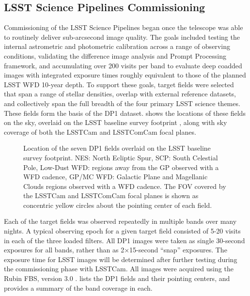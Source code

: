 \subsection{LSST Science Pipelines Commissioning
\label{ssec:pipelines_commissioning}}
Commissioning of the \gls{LSST Science Pipelines} \citep{PSTN-019} began once the telescope was able to routinely deliver sub-arcsecond image quality.
The goals included testing the internal astrometric and photometric calibration across a range of observing conditions, validating the difference image analysis and Prompt Processing \citep{dmtn-219} framework, and accumulating over 200 visits per band to evaluate deep coadded images with integrated exposure times roughly equivalent to those of the planned LSST \gls{WFD} 10-year depth.
To support these goals, \nfields target fields were selected that span a range of stellar densities, overlap with external reference datasets, and collectively span the full breadth of the four primary \gls{LSST} science themes.
These \nfields fields form the basis of the \gls{DP1} dataset.
 shows the locations of these \nfields fields on the sky, overlaid on the LSST baseline survey footprint \citep{PSTN-051, PSTN-052, PSTN-053, PSTN-055, PSTN-056}, along with sky coverage of both the LSSTCam and \gls{LSSTComCam} focal planes.
\begin{figure*}[bt!]
\centering
{}
\caption{Location of the seven DP1 fields overlaid on the \gls{LSST} baseline survey footprint. NES: North Ecliptic Spur, SCP: South Celestial Pole, Low-Dust WFD: regions away from the GP observed with a WFD cadence, GP/MC WFD: Galactic Plane and Magellanic Clouds regions observed with a WFD cadence. The \gls{FOV} covered by the \gls{LSSTCam} and \gls{LSSTComCam} focal planes is shown as concentric yellow circles about the pointing center of each field.}
\label{fig:dp1_fields_on_sky}
\end{figure*}
Each of the \nfields target fields was observed repeatedly in multiple bands over many nights.
A typical observing \gls{epoch} for a given target field consisted of 5-20 visits in each of the three loaded filters.
All DP1 images were taken as single 30-second exposures for all bands, rather than as 2×15-second “snap” exposures.
The exposure time for LSST images will be determined after further testing during the commissioning phase with LSSTCam. 
All images were acquired using the Rubin \gls{FBS}, version 3.0 \citep{Naghib_2019, peter_yoachim_2024_13985198}.
 lists the \nfields \gls{DP1} fields and their pointing centers, and provides a summary of the band coverage in each.


